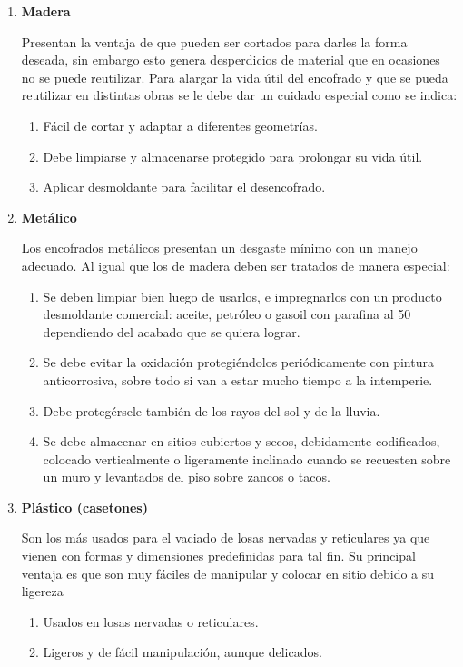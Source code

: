 \documentclass[12pt,a4paper]{article}
\begin{document}
	\begin{enumerate}
		\item \textbf{Madera}
		
		Presentan la ventaja de que pueden ser cortados para
		darles la forma deseada, sin embargo esto genera desperdicios de material que en
		ocasiones no se puede reutilizar. Para alargar la vida útil del encofrado y que se
		pueda reutilizar en distintas obras se le debe dar un cuidado especial como se
		indica:
		
		\begin{enumerate}[label=\alph*)]
			\item Fácil de cortar y adaptar a diferentes geometrías.
			\item Debe limpiarse y almacenarse protegido para prolongar su vida útil.
			\item Aplicar desmoldante para facilitar el desencofrado.
		\end{enumerate}
		\item \textbf{Metálico}
	
		Los encofrados metálicos presentan un desgaste mínimo con un manejo
		adecuado. Al igual que los de madera deben ser tratados de manera especial:
		
		
		\begin{enumerate}[label=\alph*)]
			\item 
			Se deben limpiar bien luego de usarlos, e impregnarlos con un producto
			desmoldante comercial: aceite, petróleo o gasoil con parafina al 50%
			dependiendo del acabado que se quiera lograr.
			\item 
			Se debe evitar la oxidación protegiéndolos periódicamente con pintura
			anticorrosiva, sobre todo si van a estar mucho tiempo a la intemperie.
			
			\item 
			Debe protegérsele también de los rayos del sol y de la lluvia.
			
			\item 
			Se debe almacenar en sitios cubiertos y secos, debidamente codificados,
			colocado verticalmente o ligeramente inclinado cuando se recuesten sobre
			un muro y levantados del piso sobre zancos o tacos.
			
		\end{enumerate}
		
		
		\item \textbf{Plástico (casetones)}
		
		Son los más usados para el vaciado de losas nervadas y
		reticulares ya que vienen con formas y dimensiones predefinidas para tal fin. Su
		principal ventaja es que son muy fáciles de manipular y colocar en sitio debido a
		su ligereza
		
		\begin{enumerate}[label=\alph*)]
			\item Usados en losas nervadas o reticulares.
			\item Ligeros y de fácil manipulación, aunque delicados.
		\end{enumerate}
	\end{enumerate}
	
\end{document}
